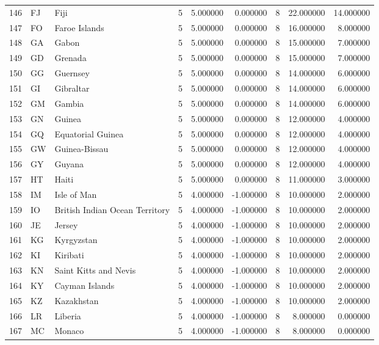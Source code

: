 \begin{tabular}{lllrrrrrr}
146 & FJ & Fiji & 5 & 5.000000 & 0.000000 & 8 & 22.000000 & 14.000000 \\
147 & FO & Faroe Islands & 5 & 5.000000 & 0.000000 & 8 & 16.000000 & 8.000000 \\
148 & GA & Gabon & 5 & 5.000000 & 0.000000 & 8 & 15.000000 & 7.000000 \\
149 & GD & Grenada & 5 & 5.000000 & 0.000000 & 8 & 15.000000 & 7.000000 \\
150 & GG & Guernsey & 5 & 5.000000 & 0.000000 & 8 & 14.000000 & 6.000000 \\
151 & GI & Gibraltar & 5 & 5.000000 & 0.000000 & 8 & 14.000000 & 6.000000 \\
152 & GM & Gambia & 5 & 5.000000 & 0.000000 & 8 & 14.000000 & 6.000000 \\
153 & GN & Guinea & 5 & 5.000000 & 0.000000 & 8 & 12.000000 & 4.000000 \\
154 & GQ & Equatorial Guinea & 5 & 5.000000 & 0.000000 & 8 & 12.000000 & 4.000000 \\
155 & GW & Guinea-Bissau & 5 & 5.000000 & 0.000000 & 8 & 12.000000 & 4.000000 \\
156 & GY & Guyana & 5 & 5.000000 & 0.000000 & 8 & 12.000000 & 4.000000 \\
157 & HT & Haiti & 5 & 5.000000 & 0.000000 & 8 & 11.000000 & 3.000000 \\
158 & IM & Isle of Man & 5 & 4.000000 & -1.000000 & 8 & 10.000000 & 2.000000 \\
159 & IO & British Indian Ocean Territory & 5 & 4.000000 & -1.000000 & 8 & 10.000000 & 2.000000 \\
160 & JE & Jersey & 5 & 4.000000 & -1.000000 & 8 & 10.000000 & 2.000000 \\
161 & KG & Kyrgyzstan & 5 & 4.000000 & -1.000000 & 8 & 10.000000 & 2.000000 \\
162 & KI & Kiribati & 5 & 4.000000 & -1.000000 & 8 & 10.000000 & 2.000000 \\
163 & KN & Saint Kitts and Nevis & 5 & 4.000000 & -1.000000 & 8 & 10.000000 & 2.000000 \\
164 & KY & Cayman Islands & 5 & 4.000000 & -1.000000 & 8 & 10.000000 & 2.000000 \\
165 & KZ & Kazakhstan & 5 & 4.000000 & -1.000000 & 8 & 10.000000 & 2.000000 \\
166 & LR & Liberia & 5 & 4.000000 & -1.000000 & 8 & 8.000000 & 0.000000 \\
167 & MC & Monaco & 5 & 4.000000 & -1.000000 & 8 & 8.000000 & 0.000000 \\

\end{tabular}
